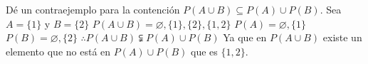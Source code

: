 \section{}
Dé un contraejemplo para la contención $P(A \cup B) \subseteq  P(A) \cup P(B)$.\newline
Sea $A = \{1\}$ y $B = \{2\}$\newline
$P(A \cup B) = \varnothing, \{1\}, \{2\}, \{1,2\}$\newline
$P(A) =  \varnothing, \{1\}$\newline
$P(B) = \varnothing, \{2\}$\newline
$\therefore P(A \cup B) \subsetneqq P(A) \cup P(B)$\newline
Ya que en $P(A \cup B)$ existe un elemento que no está en $P(A) \cup P(B)$ que es $\{1,2\}$.